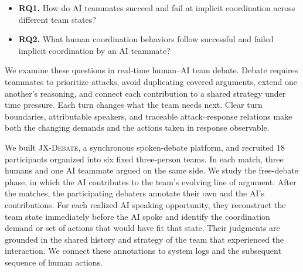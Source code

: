 \documentclass[manuscript,review,anonymous]{acmart}
\begin{document}
\begin{itemize}
\item \textbf{RQ1.} How do AI teammates succeed and fail at implicit coordination across different team states?
\item \textbf{RQ2.} What human coordination behaviors follow successful and failed implicit coordination by an AI teammate?
\end{itemize}

We examine these questions in real-time human--AI team debate. Debate requires teammates to prioritize attacks, avoid duplicating covered arguments, extend one another's reasoning, and connect each contribution to a shared strategy under time pressure. Each turn changes what the team needs next. Clear turn boundaries, attributable speakers, and traceable attack--response relations make both the changing demands and the actions taken in response observable.

We built \textsc{JX-Debate}, a synchronous spoken-debate platform, and recruited 18 participants organized into six fixed three-person teams. In each match, three humans and one AI teammate argued on the same side. We study the free-debate phase, in which the AI contributes to the team's evolving line of argument. After the matches, the participating debaters annotate their own and the AI's contributions. For each realized AI speaking opportunity, they reconstruct the team state immediately before the AI spoke and identify the coordination demand or set of actions that would have fit that state. Their judgments are grounded in the shared history and strategy of the team that experienced the interaction. We connect these annotations to system logs and the subsequent sequence of human actions.
\end{document}
